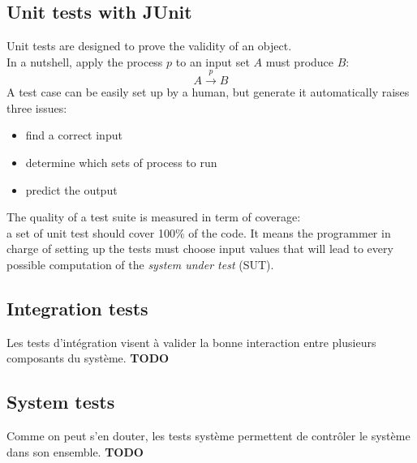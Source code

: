 \documentclass[a4paper]{report}
\begin{document}
\subsection*{Unit tests with JUnit}
Unit tests are designed to prove the validity of an object.\\
In a nutshell, apply the process $p$ to an input set $A$ must produce $B$:\\
\[A \xrightarrow{p} B\]
A test case can be easily set up by a human, but generate it automatically raises three issues:
\begin{itemize}
\item find a correct input
\item determine which sets of process to run
\item predict the output
\end{itemize}
The quality of a test suite is measured in term of coverage:\\
a set of unit test should cover 100\% of the code. It means the programmer in charge of setting up the tests must choose input values that will lead to every possible computation of the \textit{system under test} (SUT).\\

\subsection*{Integration tests}
Les tests d'intégration visent à valider la bonne interaction entre plusieurs composants du système.{\color{red} \textbf{TODO}}\\

\subsection*{System tests}
Comme on peut s'en douter, les tests système permettent de contrôler le système dans son ensemble.{\color{red} \textbf{TODO}}\\

\end{document}
